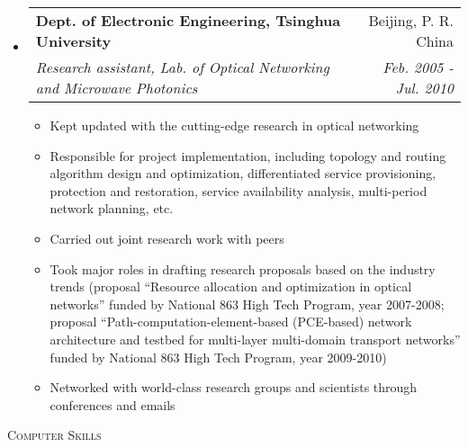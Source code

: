 \documentclass[letterpaper,11pt]{article}
\makeatletter
\newcommand{\resheading}[1]{{\noindent\large \colorbox{mygrey}{
\begin{minipage}{1.0\textwidth}{\textsc{#1 \vphantom{p\^{E}}}}\end{minipage}}}}
\newcommand{\ressubheading}[4]{
\begin{tabular*}{6.69in}{l@{\extracolsep{\fill}}r}
        \textbf{#1} & #2 \\
        \textit{#3} & \textit{#4} \\
\end{tabular*}\vspace{-6pt}
}
\newcommand{\resitem}[1]{\item #1 \vspace{-2pt}}
\makeatother
\begin{document}
\begin{itemize}
\item
    \ressubheading{Dept. of Electronic Engineering, Tsinghua University}{Beijing, P. R. China}%
    {Research assistant, Lab. of Optical Networking and Microwave Photonics}{Feb. 2005 - Jul. 2010} %
    \begin{itemize}
        \resitem{Kept updated with the cutting-edge research in optical networking}
        \resitem{Responsible for project implementation, including topology and routing algorithm design and optimization,
        differentiated service provisioning, protection and restoration, service availability analysis, multi-period network planning, etc.}
        \resitem{Carried out joint research work with peers} %
        \resitem{Took major roles in drafting research proposals based on the industry trends
        (proposal ``Resource allocation and optimization in optical networks'' funded by National 863 High Tech Program, year 2007-2008; %
        proposal ``Path-computation-element-based (PCE-based) network architecture and testbed for multi-layer multi-domain transport
        networks'' funded by National 863 High Tech Program, year 2009-2010)} %
        \resitem{Networked with world-class research groups and scientists through conferences and emails} %
    \end{itemize}

\end{itemize}




\resheading{Computer Skills}%
\end{document}
